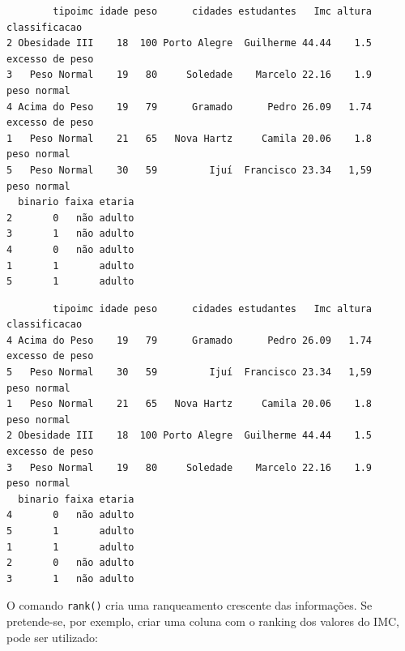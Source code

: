 \documentclass[12pt,portuguese,oneside]{book}
\newenvironment{Shaded}{\begin{snugshade}}{\end{snugshade}}
\newcommand{\KeywordTok}[1]{\textcolor[rgb]{0.13,0.29,0.53}{\textbf{#1}}}
\newcommand{\DataTypeTok}[1]{\textcolor[rgb]{0.13,0.29,0.53}{#1}}
\newcommand{\CommentTok}[1]{\textcolor[rgb]{0.56,0.35,0.01}{\textit{#1}}}
\newcommand{\OtherTok}[1]{\textcolor[rgb]{0.56,0.35,0.01}{#1}}
\newcommand{\OperatorTok}[1]{\textcolor[rgb]{0.81,0.36,0.00}{\textbf{#1}}}
\newcommand{\NormalTok}[1]{#1}
\begin{document}
\begin{Shaded}
\end{Shaded}

\begin{verbatim}
        tipoimc idade peso      cidades estudantes   Imc altura   classificacao
2 Obesidade III    18  100 Porto Alegre  Guilherme 44.44    1.5 excesso de peso
3   Peso Normal    19   80     Soledade    Marcelo 22.16    1.9     peso normal
4 Acima do Peso    19   79      Gramado      Pedro 26.09   1.74 excesso de peso
1   Peso Normal    21   65   Nova Hartz     Camila 20.06    1.8     peso normal
5   Peso Normal    30   59         Ijuí  Francisco 23.34   1,59     peso normal
  binario faixa etaria
2       0   não adulto
3       1   não adulto
4       0   não adulto
1       1       adulto
5       1       adulto
\end{verbatim}

\begin{Shaded}
\end{Shaded}

\begin{verbatim}
        tipoimc idade peso      cidades estudantes   Imc altura   classificacao
4 Acima do Peso    19   79      Gramado      Pedro 26.09   1.74 excesso de peso
5   Peso Normal    30   59         Ijuí  Francisco 23.34   1,59     peso normal
1   Peso Normal    21   65   Nova Hartz     Camila 20.06    1.8     peso normal
2 Obesidade III    18  100 Porto Alegre  Guilherme 44.44    1.5 excesso de peso
3   Peso Normal    19   80     Soledade    Marcelo 22.16    1.9     peso normal
  binario faixa etaria
4       0   não adulto
5       1       adulto
1       1       adulto
2       0   não adulto
3       1   não adulto
\end{verbatim}

O comando \texttt{rank()} cria uma ranqueamento crescente das
informações. Se pretende-se, por exemplo, criar uma coluna com o ranking
dos valores do IMC, pode ser utilizado:
\end{document}
